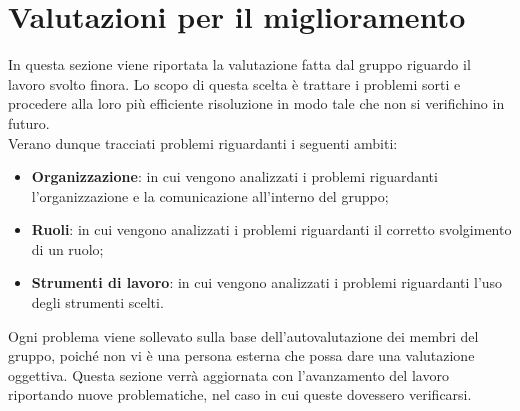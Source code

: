 \section{Valutazioni per il miglioramento}
In questa sezione viene riportata la valutazione fatta dal gruppo riguardo il 
lavoro svolto finora. Lo scopo di questa scelta è trattare i problemi sorti e
procedere alla loro più efficiente risoluzione in modo tale che non si verifichino
in futuro. \\
Verano dunque tracciati problemi riguardanti i seguenti ambiti:

\begin{itemize}
	\item \textbf{Organizzazione}: in cui vengono analizzati i problemi riguardanti 
		l'organizzazione e la comunicazione all'interno del gruppo;
	\item \textbf{Ruoli}: in cui vengono analizzati i problemi riguardanti il 
		corretto svolgimento di un ruolo;
	\item \textbf{Strumenti di lavoro}: in cui vengono analizzati i problemi riguardanti 
		l'uso degli strumenti scelti.
\end{itemize}

\noindent Ogni problema viene sollevato sulla base dell'autovalutazione dei membri del 
gruppo, poiché non vi è una persona esterna che possa dare una valutazione
oggettiva. 
Questa sezione verrà aggiornata con l'avanzamento del lavoro riportando nuove 
problematiche, nel caso in cui queste dovessero verificarsi.


